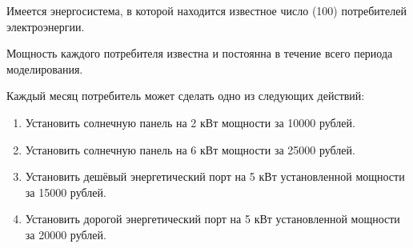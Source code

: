 
Имеется энергосистема, в которой находится известное число (100) потребителей электроэнергии.

Мощность каждого потребителя известна и постоянна в течение всего периода моделирования.

Каждый месяц потребитель может сделать одно из следующих действий:

\begin{enumerate}
    \item Установить солнечную панель на 2 кВт мощности за 10000 рублей.
    \item Установить солнечную панель на 6 кВт мощности за 25000 рублей.
    \item Установить дешёвый энергетический порт на 5 кВт установленной мощности за 15000 рублей.
    \item Установить дорогой энергетический порт на 5 кВт установленной мощности за 20000 рублей.    
\end{enumerate}

